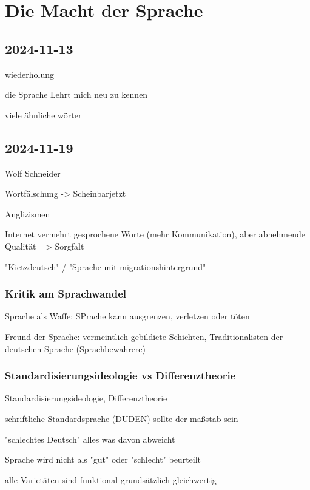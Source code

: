 \stopchapter

\chapter{Die Macht der Sprache}

\section{2024-11-13}

\startitemize[packed]
\item wiederholung
\item die Sprache Lehrt mich neu zu kennen
\item viele ähnliche wörter
\item 
\stopitemize

\section{2024-11-19}

Wolf Schneider

\startitemize[packed]
\item Wortfälschung -> Scheinbarjetzt
\item Anglizismen
\item Internet vermehrt gesprochene Worte (mehr Kommunikation), aber abnehmende Qualität => Sorgfalt
\item "Kietzdeutsch" / "Sprache mit migrationshintergrund"
\stopitemize

\subsection{Kritik am Sprachwandel}

\startitemize[packed]
\item Sprache als Waffe: SPrache kann ausgrenzen, verletzen oder töten
\item Freund der Sprache: vermeintlich gebildiete Schichten, Traditionalisten der deutschen Sprache (Sprachbewahrere)
\stopitemize

\subsection{Standardisierungsideologie vs Differenztheorie}

\startplacetable[location={here},title={Vergleich}]
\setupTABLE[r][1][background=color,backgroundcolor=gray]
\bTABLE[frame=off]
\startCSV
Standardisierungsideologie, Differenztheorie
\stopCSV
\bTR
\bTD %
\startitemize[packed]
\item schriftliche Standardsprache (DUDEN) sollte der maßstab sein
\item "schlechtes Deutsch" alles was davon abweicht
\stopitemize
\eTD
\bTD %
\startitemize[packed]
\item Sprache wird nicht als "gut" oder "schlecht" beurteilt
\item alle Varietäten sind funktional grundsätzlich gleichwertig
\stopitemize
\eTD
\eTR
\eTABLE
\stopplacetable

